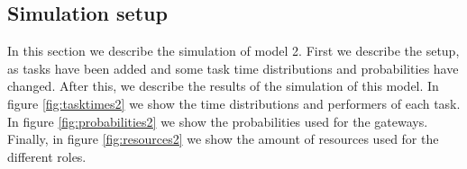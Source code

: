 

\subsection{Simulation setup}
In this section we describe the simulation of model 2. First we describe the setup, as tasks have been added and some task time distributions and probabilities have changed. After this, we describe the results of the simulation of this model. In figure \ref{fig:tasktimes2} we show the time distributions and performers of each task. In figure \ref{fig:probabilities2} we show the probabilities used for the gateways. Finally, in figure \ref{fig:resources2} we show the amount of resources used for the different roles.\\

